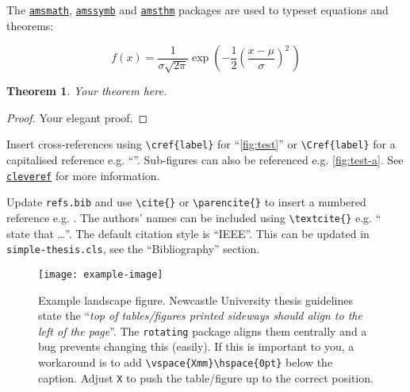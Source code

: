 The \href{https://ctan.org/pkg/amsmath}{\texttt{amsmath}}, \href{https://ctan.org/pkg/amssymb}{\texttt{amssymb}}
and \href{https://ctan.org/pkg/amsthm}{\texttt{amsthm}} packages are used to typeset equations
and theorems:

\begin{equation}
  f(x) = \frac{1}{\sigma\sqrt{2\pi}} \exp\left( -\frac{1}{2}\left(\frac{x-\mu}{\sigma}\right)^{\!2}\,\right)
\end{equation}

\newtheorem{theorem}{Theorem}
\begin{theorem}
  Your theorem here.
\end{theorem}
\begin{proof}
  Your elegant proof.
\end{proof}


Insert cross-references using \verb|\cref{label}| for ``\cref{fig:test}'' or \verb|\Cref{label}|
for a capitalised reference e.g. ``''. Sub-figures can also be referenced
e.g. \cref{fig:test-a}. See \href{https://ctan.org/pkg/cleveref}{\texttt{cleveref}} for more
information.


Update \texttt{refs.bib} and use \verb|\cite{}| or \verb|\parencite{}| to insert a numbered
reference e.g. \cite{lecun_deep_2015}. The authors' names can be included using \verb|\textcite{}|
e.g. ``\textcite{lecun_deep_2015} state that \dots''. The default citation style is ``IEEE''.
This can be updated in \texttt{simple-thesis.cls}, see the ``Bibliography'' section.

\begin{sidewaysfigure}
  \centering
  \texttt{[image: example-image]}
  \caption{Example landscape figure. Newcastle University thesis guidelines state the
  ``\textit{top of tables/figures printed sideways should align to the left of the page}''.
  The \texttt{rotating} package aligns them centrally and a bug prevents changing this (easily).
  If this is important to you, a workaround is to add \texttt{\textbackslash vspace\{Xmm\}\textbackslash hspace\{0pt\}}
  below the caption. Adjust \texttt{X} to push the table/figure up to the correct position.}
  \label{fig:landscape}
  \vspace{16mm}\hspace{0pt}
\end{sidewaysfigure}

